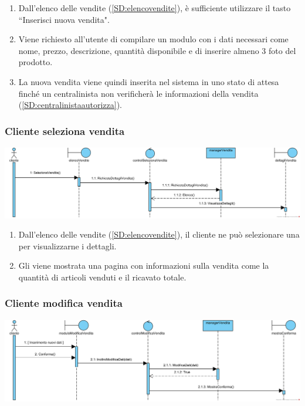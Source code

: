 \documentclass[12pt,a4paper]{article}
\begin{document}
\begin{enumerate}
\item Dall'elenco delle vendite (\ref{SD:elencovendite}), è sufficiente utilizzare il tasto ``Inserisci nuova vendita".
\item Viene richiesto all'utente di compilare un modulo con i dati necessari come nome, prezzo, descrizione, quantità disponibile e di inserire almeno 3 foto del prodotto.
\item La nuova vendita viene quindi inserita nel sistema in uno stato di attesa finché un centralinista non verificherà le informazioni della vendita (\ref{SD:centralinistaautorizza}).
\end{enumerate}

\subsubsection{Cliente seleziona vendita}
\label{SD:selezionavenditacliente}

\begin{center}
\includegraphics[width=\textwidth]{SequenceDiagram/ClienteVenditaSeleziona}
\end{center}

\begin{enumerate}
\item Dall'elenco delle vendite (\ref{SD:elencovendite}), il cliente ne può selezionare una per visualizzarne i dettagli.
\item Gli viene mostrata una pagina con informazioni sulla vendita come la quantità di articoli venduti e il ricavato totale.
\end{enumerate}

\subsubsection{Cliente modifica vendita}
\label{SD:modificavendita}

\begin{center}
\includegraphics[width=\textwidth]{SequenceDiagram/ClienteVenditaModifica}
\end{center}
\end{document}
